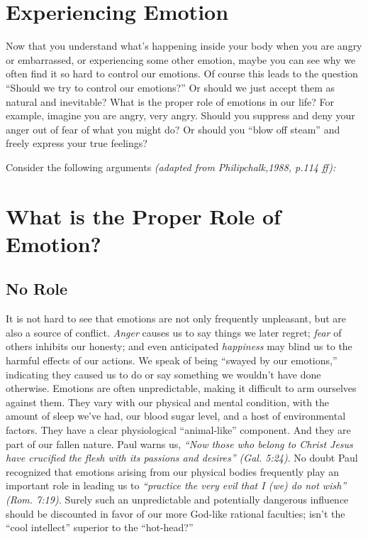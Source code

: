 \documentclass[
]{book}
\begin{document}
\hypertarget{experiencing-emotion}{%
\section{Experiencing Emotion}\label{experiencing-emotion}}

Now that you understand what's happening inside your body when you are angry or embarrassed, or experiencing some other emotion, maybe you can see why we often find it so hard to control our emotions. Of course this leads to the question ``Should we try to control our emotions?'' Or should we just accept them as natural and inevitable? What is the proper role of emotions in our life? For example, imagine you are angry, very angry. Should you suppress and deny your anger out of fear of what you might do? Or should you ``blow off steam'' and freely express your true feelings?

Consider the following arguments \emph{(adapted from Philipchalk,1988, p.114 ff):}

\hypertarget{what-is-the-proper-role-of-emotion}{%
\section{What is the Proper Role of Emotion?}\label{what-is-the-proper-role-of-emotion}}

\hypertarget{no-role}{%
\subsection*{No Role}\label{no-role}}

It is not hard to see that emotions are not only frequently unpleasant, but are also a source of conflict. \emph{Anger} causes us to say things we later regret; \emph{fear} of others inhibits our honesty; and even anticipated \emph{happiness} may blind us to the harmful effects of our actions. We speak of being ``swayed by our emotions,'' indicating they caused us to do or say something we wouldn't have done otherwise. Emotions are often unpredictable, making it difficult to arm ourselves against them. They vary with our physical and mental condition, with the amount of sleep we've had, our blood sugar level, and a host of environmental factors. They have a clear physiological ``animal-like'' component. And they are part of our fallen nature. Paul warns us, \emph{``Now those who belong to Christ Jesus have crucified the flesh with its passions and desires'' (Gal. 5:24)}. No doubt Paul recognized that emotions arising from our physical bodies frequently play an important role in leading us to \emph{``practice the very evil that I (we) do not wish'' (Rom. 7:19).} Surely such an unpredictable and potentially dangerous influence should be discounted in favor of our more God-like rational faculties; isn't the ``cool intellect'' superior to the ``hot-head?''
\end{document}
